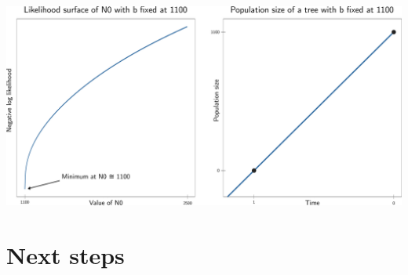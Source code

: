 \documentclass[aspectratio=169]{beamer}
\begin{document}
\begin{frame} \frametitle{\insertsection}

    \centering\includegraphics[width=\textwidth]{images/linear-progress}

\end{frame}

\section{Next steps}
\end{document}

